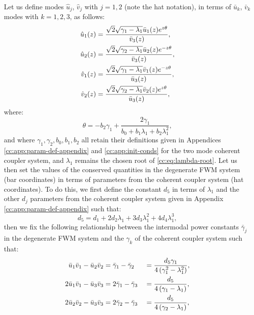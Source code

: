 \documentclass[11pt,a4paper]{article}
\numberwithin{equation}{section}
\begin{document}
Let us define modes $\hat{u}_j$, $\hat{v}_j$ with $j=1,2$ (note the hat notation), in terms of $\bar{u}_k$, $\bar{v}_k$ modes with $k=1,2,3$, as follows:
\begin{align}
  \hat{u}_1{\left(z\right)} &= \frac{\sqrt{2} \sqrt{{\gamma}_{1} - {\lambda}_{1}} \bar{u}_1{\left(z\right)} e^{z \theta}}{\bar{v}_3{\left(z\right)}}, \notag \\
  \hat{u}_2{\left(z\right)} &= \frac{\sqrt{2} \sqrt{{\gamma}_{2} - {\lambda}_{1}} \bar{u}_2{\left(z\right)} e^{-z \theta}}{\bar{v}_3{\left(z\right)}}, \notag \\
  \hat{v}_1{\left(z\right)} &= \frac{\sqrt{2} \sqrt{{\gamma}_{1} - {\lambda}_{1}} \bar{v}_1{\left(z\right)} e^{-z \theta}}{\bar{u}_3{\left(z\right)}}, \notag \\
  \hat{v}_2{\left(z\right)} &= \frac{\sqrt{2} \sqrt{{\gamma}_{2} - {\lambda}_{1}} \bar{v}_2{\left(z\right)} e^{z \theta}}{\bar{u}_3{\left(z\right)}}, \label{cc:eq:projection-hat-as-bars}
\end{align}
where:
\begin{equation}
\theta = - {b}_{2} {\gamma}_{1} + \frac{2 {\gamma}_{1}}{{b}_{0} + {b}_{1} {\lambda}_{1} + {b}_{2} {\lambda}_{1}^{2}},
\end{equation}
and where $\gamma_1, \gamma_2, b_0, b_1, b_2$ all retain their definitions given in Appendices \ref{cc:app:param-def-appendix} and \ref{cc:app:init-conds} for the two mode coherent coupler system, and $\lambda_1$ remains the chosen root of \eqref{cc:eq:lambda-root}.
Let us then set the values of the conserved quantities in the degenerate FWM system (bar coordinates) in terms of parameters from the coherent coupler system (hat coordinates). 
To do this, we first define the constant $d_5$ in terms of $\lambda_1$ and the other $d_j$ parameters from the coherent coupler system given in Appendix \ref{cc:app:param-def-appendix} such that:
\begin{equation}
{d}_{5} = {d}_{1} + 2 {d}_{2} {\lambda}_{1} + 3 {d}_{3} {\lambda}_{1}^{2} + 4 {d}_{4} {\lambda}_{1}^{3},
\end{equation}
then we fix the following relationship between the intermodal power constants $\bar{\gamma}_j$ in the degenerate FWM system and the $\gamma_k$ of the coherent coupler system such that:
\begin{alignat}{2}
\bar{u}_1\bar{v}_1 - \bar{u}_2\bar{v}_2 &= \bar{\gamma}_1 - \bar{\gamma}_2 &&= \frac{{d}_{5} {\gamma}_{1}}{4 \left({\gamma}_{1}^{2} -  {\lambda}_{1}^{2}\right)}, \notag \\
2\bar{u}_1\bar{v}_1 - \bar{u}_3\bar{v}_3 &= 2\bar{\gamma}_1 - \bar{\gamma}_3 &&= \frac{d_5}{4\left(\gamma_1 - \lambda_1\right)}, \notag \\
2\bar{u}_2\bar{v}_2 - \bar{u}_3\bar{v}_3 &= 2\bar{\gamma}_2 - \bar{\gamma}_3 &&= \frac{d_5}{4\left(\gamma_2 - \lambda_1\right)},
\end{alignat}
\end{document}

